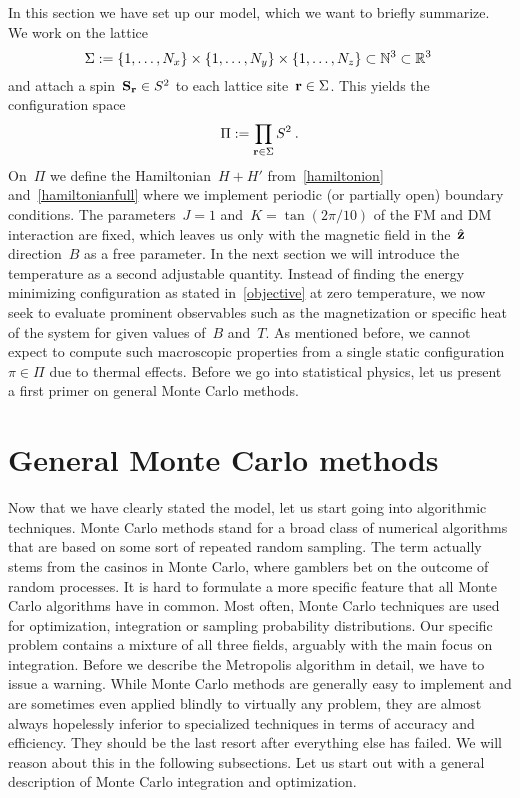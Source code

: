In this section we have set up our model, which we want to briefly summarize. We
work on the lattice
%
\begin{equation}
  \Sigma := \{1,\dots,N_x\} \times \{1,\dots,N_y\} \times
  \{1,\dots,N_z\} \subset \mathbb{N}^3 \subset \mathbb{R}^3\:
\end{equation}
%
and attach a spin~$\mathbf{S}_{\mathbf{r}} \in S^2$ to each lattice site~$\mathbf{r} \in \Sigma$. This
yields the configuration space
%
\begin{equation}
  \Pi := \prod_{\mathbf{r} \in \Sigma} S^2\:.
\end{equation}
%
On~$\Pi$ we define the Hamiltonian~$H+H'$ from~\eqref{hamiltonion}
and~\eqref{hamiltonianfull} where we implement periodic (or partially open)
boundary conditions. The parameters~$J=1$ and~$K=\tan(2\pi / 10)$ of the FM and
DM interaction are fixed, which leaves us only with the magnetic field in
the~$\hat{\mathbf{z}}$ direction~$B$ as a free parameter. In the next section we will
introduce the temperature as a second adjustable quantity. Instead of finding
the energy minimizing configuration as stated in~\eqref{objective} at zero
temperature, we now seek to evaluate prominent observables such as the
magnetization or specific heat of the system for given values of~$B$ and~$T$. As
mentioned before, we cannot expect to compute such macroscopic properties from a
single static configuration~$\pi \in \Pi$ due to thermal effects. Before we go
into statistical physics, let us present a first primer on general Monte Carlo
methods.
%
\section{General Monte Carlo methods}\label{sec:mctheory}
%
Now that we have clearly stated the model, let us start going into algorithmic
techniques. Monte Carlo methods stand for a broad class of numerical algorithms
that are based on some sort of repeated random sampling. The term actually stems
from the casinos in Monte Carlo, where gamblers bet on the outcome of random
processes. It is hard to formulate a more specific feature that all Monte Carlo
algorithms have in common. Most often, Monte Carlo techniques are used for
optimization, integration or sampling probability distributions. Our specific
problem contains a mixture of all three fields, arguably with the main focus on
integration. Before we describe the Metropolis algorithm in detail, we have to
issue a warning. While Monte Carlo methods are generally easy to implement and
are sometimes even applied blindly to virtually any problem, they are almost
always hopelessly inferior to specialized techniques in terms of accuracy and
efficiency. They should be the last resort after everything else has failed. We
will reason about this in the following subsections.  Let us start out with a
general description of Monte Carlo integration and optimization.

